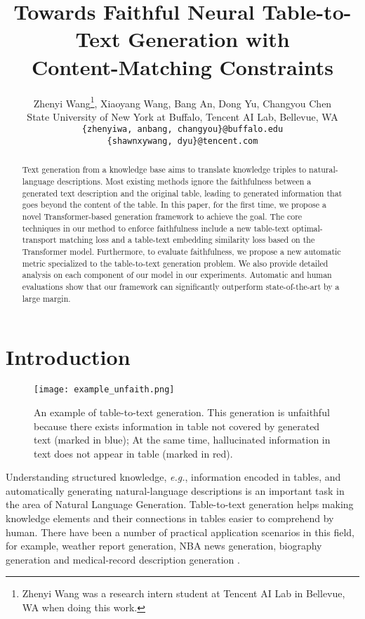 \documentclass[11pt,a4paper]{article}
\title{Towards Faithful Neural Table-to-Text Generation with \\ Content-Matching Constraints}
\author{
  Zhenyi Wang\thanks{Zhenyi Wang was a research intern student at Tencent AI Lab in Bellevue, WA when doing this work.}, Xiaoyang Wang, Bang An,  Dong Yu, Changyou Chen\\
  State University of New York at Buffalo, Tencent AI Lab, Bellevue, WA\\
  \texttt{\{zhenyiwa, anbang, changyou\}@buffalo.edu}\\
  \texttt{\{shawnxywang, dyu\}@tencent.com}
}
\date{}
\begin{document}
\maketitle
\begin{abstract}
Text generation from a knowledge base aims to translate knowledge triples to natural-language descriptions. Most existing methods ignore the faithfulness between a generated text description and the original table, leading to generated information that goes beyond the content of the table. In this paper, for the first time, we propose a novel Transformer-based generation framework to achieve the goal. The core techniques in our method to enforce faithfulness include a new table-text optimal-transport matching loss and a table-text embedding similarity loss based on the Transformer model. Furthermore, to evaluate faithfulness, we propose a new automatic metric specialized to the table-to-text generation problem. We also provide detailed analysis on each component of our model in our experiments. Automatic and human evaluations show that our framework can significantly outperform state-of-the-art by a large margin.

\end{abstract}

\section{Introduction}
\begin{figure}[t]
    \centering
    \texttt{[image: example\_unfaith.png]}
    \caption{An example of table-to-text generation. This generation is unfaithful because there exists information in table not covered by generated text (marked in blue); At the same time, hallucinated information in text does not appear in table (marked in red).}
    \label{fig:example}
    \vspace{-0.5cm}
\end{figure}
Understanding structured knowledge, \textit{e.g.}, information encoded in tables, and automatically generating natural-language descriptions is an important task in the area of Natural Language Generation. 
Table-to-text generation helps making knowledge elements and their connections in tables easier to comprehend by human. 
There have been a number of practical application scenarios in this field, for example, weather report generation, NBA news generation, biography generation and medical-record description generation \cite{weather, NBA, bio, medical}. 
\end{document}
